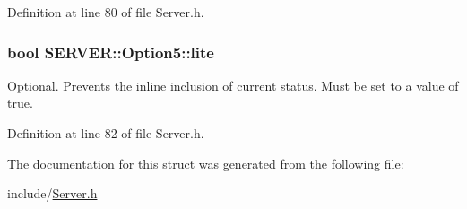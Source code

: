 Definition at line 80 of file Server.h.\hypertarget{structSERVER_1_1Option5_18f4978757ae6b72d8007976964c7d71}{
\subsubsection{\setlength{\rightskip}{0pt plus 5cm}bool {\bf SERVER::Option5::lite}}}
\label{structSERVER_1_1Option5_18f4978757ae6b72d8007976964c7d71}


Optional. Prevents the inline inclusion of current status. Must be set to a value of true. 



Definition at line 82 of file Server.h.

The documentation for this struct was generated from the following file:\begin{CompactItemize}
\item 
include/\hyperlink{Server_8h}{Server.h}\end{CompactItemize}
